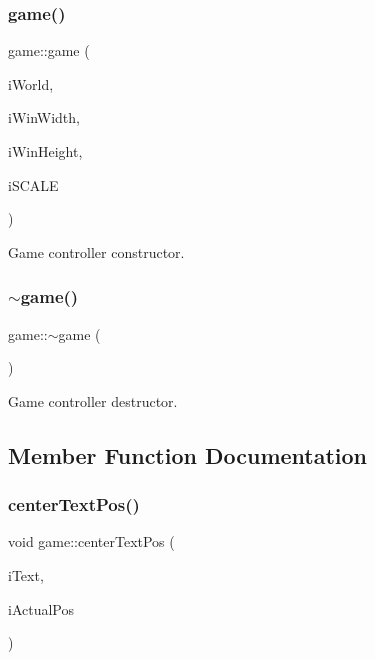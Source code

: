 \subsubsection{\texorpdfstring{game()}{game()}}
{\footnotesize\ttfamily game\+::game (\begin{DoxyParamCaption}\item[{b2\+World \&}]{i\+World,  }\item[{int}]{i\+Win\+Width,  }\item[{int}]{i\+Win\+Height,  }\item[{double}]{i\+S\+C\+A\+LE }\end{DoxyParamCaption})}



Game controller constructor. 

\mbox{\label{classgame_ae87abd20c4d8a7906fa48e690a5f1d07}} 
\subsubsection{\texorpdfstring{$\sim$game()}{~game()}}
{\footnotesize\ttfamily game\+::$\sim$game (\begin{DoxyParamCaption}{ }\end{DoxyParamCaption})}



Game controller destructor. 



\subsection{Member Function Documentation}
\mbox{\label{classgame_a0b6f017a6d6d053ae89bc2ac3cbaa1aa}} 
\subsubsection{\texorpdfstring{center\+Text\+Pos()}{centerTextPos()}}
{\footnotesize\ttfamily void game\+::center\+Text\+Pos (\begin{DoxyParamCaption}\item[{sf\+::\+Text \&}]{i\+Text,  }\item[{float}]{i\+Actual\+Pos }\end{DoxyParamCaption})}



